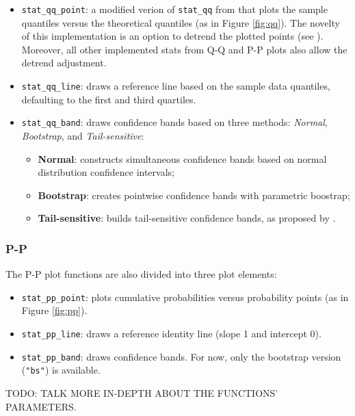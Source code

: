 \begin{itemize}
\item
  \texttt{stat\_qq\_point}: a modified verion of \texttt{stat\_qq} from
   that plots the sample quantiles versus the theoretical
  quantiles (as in Figure \ref{fig:qq}). The novelty of this
  implementation is an option to detrend the plotted points (see
  ). Moreover, all other implemented stats
  from Q-Q and P-P plots also allow the detrend adjustment.
\item
  \texttt{stat\_qq\_line}: draws a reference line based on the sample
  data quantiles, defaulting to the first and third quartiles.
\item
  \texttt{stat\_qq\_band}: draws confidence bands based on three
  methods: \emph{Normal}, \emph{Bootstrap}, and \emph{Tail-sensitive}:

  \begin{itemize}
  \tightlist
  \item
    \textbf{Normal}: constructs simultaneous confidence bands based on
    normal distribution confidence intervals;
  \item
    \textbf{Bootstrap}: creates pointwise confidence bands with
    parametric boostrap;
  \item
    \textbf{Tail-sensitive}: builds tail-sensitive confidence bands, as
    proposed by \citet{Aldor-Noiman2013-xw}.
  \end{itemize}
\end{itemize}

\subsubsection{P-P}\label{p-p}

The P-P plot functions are also divided into three plot elements:

\begin{itemize}
\item
  \texttt{stat\_pp\_point}: plots cumulative probabilities versus
  probability points (as in Figure \ref{fig:pp}).
\item
  \texttt{stat\_pp\_line}: draws a reference identity line (slope 1 and
  intercept 0).
\item
  \texttt{stat\_pp\_band}: draws confidence bands. For now, only the
  bootstrap version (\texttt{"bs"}) is available.
\end{itemize}

TODO: TALK MORE IN-DEPTH ABOUT THE FUNCTIONS' PARAMETERS.

